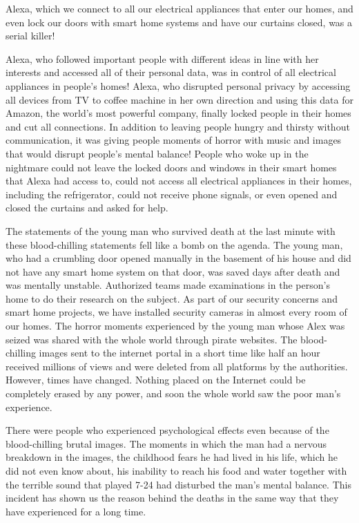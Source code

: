 \documentclass[]{book}
\begin{document}
Alexa, which we connect to all our electrical appliances that enter our homes, and even lock our doors with smart home systems and have our curtains closed, was a serial killer!

Alexa, who followed important people with different ideas in line with her interests and accessed all of their personal data, was in control of all electrical appliances in people's homes! Alexa, who disrupted personal privacy by accessing all devices from TV to coffee machine in her own direction and using this data for Amazon, the world's most powerful company, finally locked people in their homes and cut all connections. In addition to leaving people hungry and thirsty without communication, it was giving people moments of horror with music and images that would disrupt people's mental balance! People who woke up in the nightmare could not leave the locked doors and windows in their smart homes that Alexa had access to, could not access all electrical appliances in their homes, including the refrigerator, could not receive phone signals, or even opened and closed the curtains and asked for help.

The statements of the young man who survived death at the last minute with these blood-chilling statements fell like a bomb on the agenda. The young man, who had a crumbling door opened manually in the basement of his house and did not have any smart home system on that door, was saved days after death and was mentally unstable. Authorized teams made examinations in the person's home to do their research on the subject. As part of our security concerns and smart home projects, we have installed security cameras in almost every room of our homes. The horror moments experienced by the young man whose Alex was seized was shared with the whole world through pirate websites. The blood-chilling images sent to the internet portal in a short time like half an hour received millions of views and were deleted from all platforms by the authorities. However, times have changed. Nothing placed on the Internet could be completely erased by any power, and soon the whole world saw the poor man's experience.

There were people who experienced psychological effects even because of the blood-chilling brutal images. The moments in which the man had a nervous breakdown in the images, the childhood fears he had lived in his life, which he did not even know about, his inability to reach his food and water together with the terrible sound that played 7-24 had disturbed the man's mental balance. This incident has shown us the reason behind the deaths in the same way that they have experienced for a long time.
\end{document}
